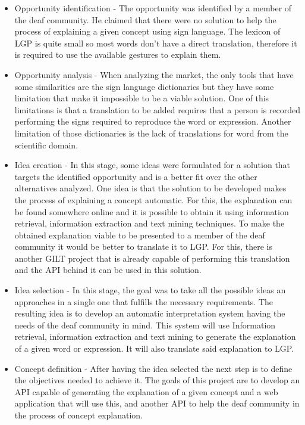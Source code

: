 \begin{itemize}
    \item Opportunity identification - The opportunity was identified by a member of the deaf community.
    He claimed that there were no solution to help the process of explaining a given concept using sign language.
    The lexicon of \gls{LGP} is quite small so most words don't have a direct translation, therefore it is required to use the available gestures to explain them.

    \item Opportunity analysis - When analyzing the market, the only tools that have some similarities are the sign language dictionaries but they have some limitation that make it impossible to be a viable solution.
    One of this limitations is that a translation to be added requires that a person is recorded performing the signs required to reproduce the word or expression.
    Another limitation of those dictionaries is the lack of translations for word from the scientific domain.

    \item Idea creation - In this stage, some ideas were formulated for a solution that targets the identified opportunity and is a better fit over the other alternatives analyzed.
    One idea is that the solution to be developed makes the process of explaining a concept automatic.
    For this, the explanation can be found somewhere online and it is possible to obtain it using information retrieval, information extraction and text mining techniques.
    To make the obtained explanation viable to be presented to a member of the deaf community it would be better to translate it to \gls{LGP}.
    For this, there is another GILT project that is already capable of performing this translation and the \gls{API} behind it can be used in this solution.

    \item Idea selection - In this stage, the goal was to take all the possible ideas an approaches in a single one that fulfills the necessary requirements.
    The resulting idea is to develop an automatic interpretation system having the needs of the deaf community in mind.
    This system will use Information retrieval, information extraction and text mining to generate the explanation of a given word or expression.
    It will also translate said explanation to \gls{LGP}.

    \item Concept definition - After having the idea selected the next step is to define the objectives needed to achieve it.
    The goals of this project are to develop an \gls{API} capable of generating the explanation of a given concept and a web application that will use this, and another \gls{API} to help the deaf community in the process of concept explanation.

\end{itemize}

